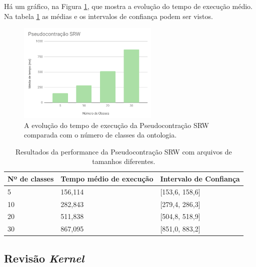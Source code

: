 Há um gráfico, na Figura \ref{img:graficosrw}, que mostra a evolução do tempo de execução médio. Na tabela \ref{tab:srw} as médias e os intervalos de confiança podem ser vistos.

\begin{figure}[H]
	\centering
	\includegraphics[width=0.6\textwidth]{Capitulos/Testes/graficosrw.png}
	\caption{A evolução do tempo de execução da Pseudocontração SRW comparada com o número de classes da ontologia.}
	\label{img:graficosrw}
\end{figure}

\begin{table}[H]
	\centering
	\begin{tabular}{|l|l|l|}
		\hline
		\textbf{Nº de classes} & \textbf{Tempo médio de execução} & \textbf{Intervalo de Confiança} \\ \hline
		5                                                 & 156,114                          & {[}153,6, 158,6{]}              \\ \hline
		10                                                & 282,843                          & {[}279,4, 286,3{]}              \\ \hline
		20                                                & 511,838                          & {[}504,8, 518,9{]}              \\ \hline
		30                                                & 867,095                          & {[}851,0, 883,2{]}              \\ \hline
	\end{tabular}
	\caption{Resultados da performance da Pseudocontração SRW com arquivos de tamanhos diferentes.}
	\label{tab:srw}
\end{table}

\subsection{Revisão \textit{Kernel}}

